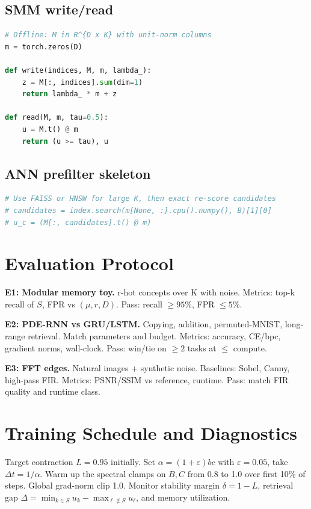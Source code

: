 \documentclass[11pt]{article}
\begin{document}
\subsection*{SMM write/read}
\begin{lstlisting}[language=Python]
# Offline: M in R^{D x K} with unit-norm columns
m = torch.zeros(D)

def write(indices, M, m, lambda_):
    z = M[:, indices].sum(dim=1)
    return lambda_ * m + z

def read(M, m, tau=0.5):
    u = M.t() @ m
    return (u >= tau), u
\end{lstlisting}

\subsection*{ANN prefilter skeleton}
\begin{lstlisting}[language=Python]
# Use FAISS or HNSW for large K, then exact re-score candidates
# candidates = index.search(m[None, :].cpu().numpy(), B)[1][0]
# u_c = (M[:, candidates].t() @ m)
\end{lstlisting}

\section{Evaluation Protocol}
\textbf{E1: Modular memory toy.} r-hot concepts over K with noise. Metrics: top-k recall of $S$, FPR vs $(\mu,r,D)$. Pass: recall $\ge 95\%$, FPR $\le 5\%$.

\textbf{E2: PDE-RNN vs GRU/LSTM.} Copying, addition, permuted-MNIST, long-range retrieval. Match parameters and budget. Metrics: accuracy, CE/bpc, gradient norms, wall-clock. Pass: win/tie on $\ge2$ tasks at $\le$ compute.

\textbf{E3: FFT edges.} Natural images + synthetic noise. Baselines: Sobel, Canny, high-pass FIR. Metrics: PSNR/SSIM vs reference, runtime. Pass: match FIR quality and runtime class.

\section{Training Schedule and Diagnostics}
Target contraction $L=0.95$ initially. Set $\alpha=(1+\varepsilon)bc$ with $\varepsilon=0.05$, take $\Delta t=1/\alpha$. Warm up the spectral clamps on $B,C$ from 0.8 to 1.0 over first 10\% of steps. Global grad-norm clip 1.0. Monitor stability margin $\delta=1-L$, retrieval gap $\Delta=\min_{k\in S} u_k-\max_{\ell\notin S} u_\ell$, and memory utilization.
\end{document}

